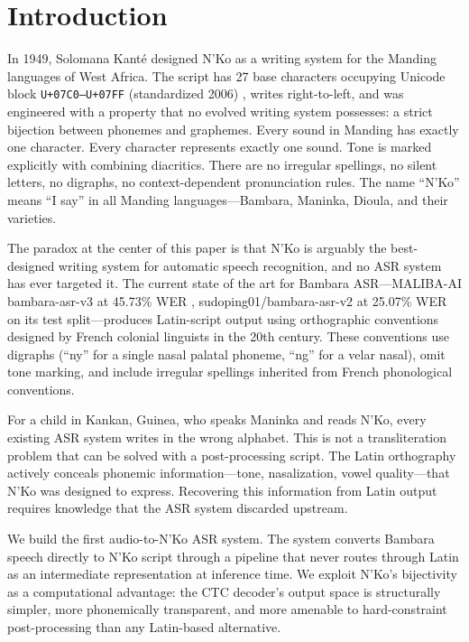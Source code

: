 \documentclass[11pt]{article}
\begin{document}
\section{Introduction}

In 1949, Solomana Kant\'{e} designed N'Ko as a writing system for the Manding languages of West Africa.
The script has 27 base characters occupying Unicode block \texttt{U+07C0--U+07FF} (standardized 2006) \cite{unicode2006nko}, writes right-to-left, and was engineered with a property that no evolved writing system possesses: a strict bijection between phonemes and graphemes.
Every sound in Manding has exactly one character.
Every character represents exactly one sound.
Tone is marked explicitly with combining diacritics.
There are no irregular spellings, no silent letters, no digraphs, no context-dependent pronunciation rules.
The name ``N'Ko'' means ``I say'' in all Manding languages---Bambara, Maninka, Dioula, and their varieties.

The paradox at the center of this paper is that N'Ko is arguably the best-designed writing system for automatic speech recognition, and no ASR system has ever targeted it.
The current state of the art for Bambara ASR---MALIBA-AI bambara-asr-v3 at 45.73\% WER \cite{maliba2024bambara}, sudoping01/bambara-asr-v2 at 25.07\% WER on its test split---produces Latin-script output using orthographic conventions designed by French colonial linguists in the 20th century.
These conventions use digraphs (``ny'' for a single nasal palatal phoneme, ``ng'' for a velar nasal), omit tone marking, and include irregular spellings inherited from French phonological conventions.

For a child in Kankan, Guinea, who speaks Maninka and reads N'Ko, every existing ASR system writes in the wrong alphabet.
This is not a transliteration problem that can be solved with a post-processing script.
The Latin orthography actively conceals phonemic information---tone, nasalization, vowel quality---that N'Ko was designed to express.
Recovering this information from Latin output requires knowledge that the ASR system discarded upstream.

We build the first audio-to-N'Ko ASR system.
The system converts Bambara speech directly to N'Ko script through a pipeline that never routes through Latin as an intermediate representation at inference time.
We exploit N'Ko's bijectivity as a computational advantage: the CTC decoder's output space is structurally simpler, more phonemically transparent, and more amenable to hard-constraint post-processing than any Latin-based alternative.
\end{document}
